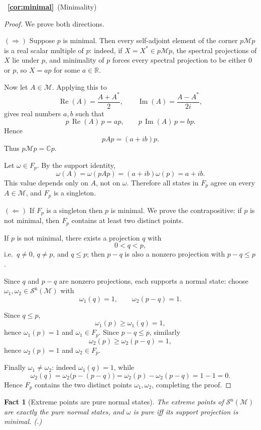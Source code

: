 \documentclass[11pt]{article}
\newtheorem{fact}[theorem]{Fact}
\newcommand{\Sn}{\mathcal{S}^{\mathrm n}}
\begin{document}
~{\bf \ref{cor:minimal}}~(Minimality)
\begin{proof}
We prove both directions.

$(\Rightarrow)$ Suppose $p$ is minimal. Then every self-adjoint element
of the corner $p\mathcal Mp$ is a real scalar multiple of $p$: indeed,
if $X=X^*\in p\mathcal Mp$, the spectral projections of $X$ lie under
$p$, and minimality of $p$ forces every spectral projection to be either
$0$ or $p$, so $X=ap$ for some $a\in\mathbb R$.

Now let $A\in\mathcal M$. Applying this to
\[
\operatorname{Re}(A)=\frac{A+A^*}{2},
\qquad
\operatorname{Im}(A)=\frac{A-A^*}{2i},
\]
gives real numbers $a,b$ such that
\[
p\,\operatorname{Re}(A)\,p=ap,
\qquad
p\,\operatorname{Im}(A)\,p=bp.
\]
Hence
\[
pAp=(a+ib)p.
\]
Thus $p\mathcal Mp=\mathbb Cp$.

Let $\omega\in F_p$. By the support identity,
\[
\omega(A)=\omega(pAp)=(a+ib)\omega(p)=a+ib.
\]
This value depends only on $A$, not on $\omega$. Therefore all states in
$F_p$ agree on every $A\in\mathcal M$, and $F_p$ is a singleton.

\medskip
\noindent
$(\Leftarrow)$ If $F_p$ is a singleton then $p$ is minimal. We prove the
contrapositive: if $p$ is not minimal, then $F_p$ contains at least two
distinct points.

If $p$ is not minimal, there exists a projection $q$ with
\[
0<q<p,
\]
i.e.\ $q\ne0$, $q\ne p$, and $q\le p$; then $p-q$ is also a nonzero
projection with $p-q\le p$.

Since $q$ and $p-q$ are nonzero projections, each supports a normal
state: choose $\omega_1,\omega_2\in\Sn(\mathcal M)$ with
\[
\omega_1(q)=1,
\qquad
\omega_2(p-q)=1.
\]

Since $q\le p$,
\[
\omega_1(p)\ge\omega_1(q)=1,
\]
hence $\omega_1(p)=1$ and $\omega_1\in F_p$. Since $p-q\le p$, similarly
\[
\omega_2(p)\ge\omega_2(p-q)=1,
\]
hence $\omega_2(p)=1$ and $\omega_2\in F_p$.

Finally $\omega_1\ne\omega_2$: indeed $\omega_1(q)=1$, while
\[
\omega_2(q)
=
\omega_2\bigl(p-(p-q)\bigr)
=
\omega_2(p)-\omega_2(p-q)
=
1-1
=
0.
\]
Hence $F_p$ contains the two distinct points $\omega_1,\omega_2$,
completing the proof.
\end{proof}

\begin{fact}[Extreme points are pure normal states]
\label{fact:extreme}
The extreme points of $\Sn(\mathcal M)$ are exactly the pure normal
states, and $\omega$ is pure iff its support projection is minimal.
(\cite[Thm.~7.3.4]{KadisonRingrose1}.)
\end{fact}
\end{document}
